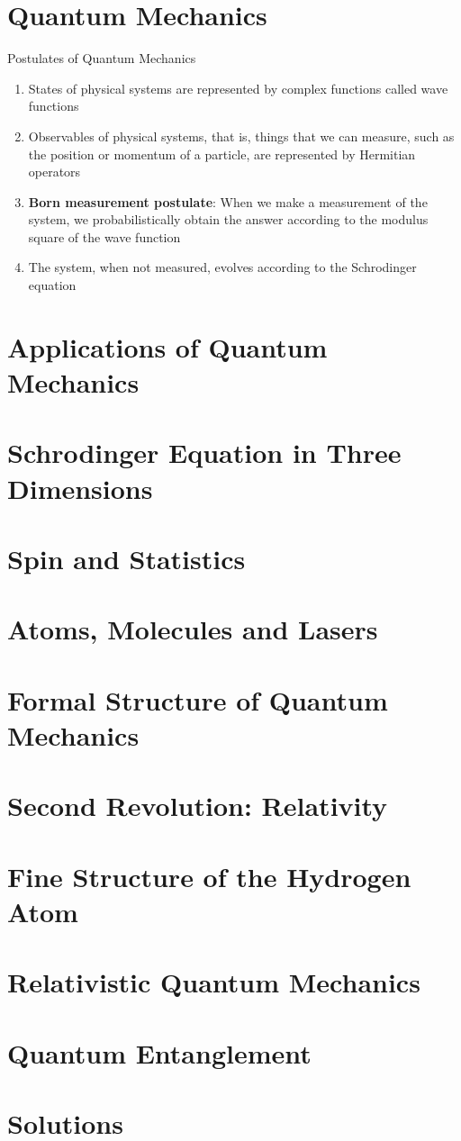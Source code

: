 \documentclass[a4paper]{article}
\begin{document}
\section{Quantum Mechanics}
Postulates of Quantum Mechanics
\begin{enumerate}
    \item States of physical systems are represented by complex functions called wave functions
    \item Observables of physical systems, that is, things that we can measure, such as the position or momentum of a particle, are represented by Hermitian operators
    \item \textbf{Born measurement postulate}: When we make a measurement of the system, we probabilistically obtain the answer according to the modulus square of the wave function
    \item The system, when not measured, evolves according to the Schrodinger equation
\end{enumerate}
\section{Applications of Quantum Mechanics}
\section{Schrodinger Equation in Three Dimensions}
\section{Spin and Statistics}
\section{Atoms, Molecules and Lasers}
\section{Formal Structure of Quantum Mechanics}
\section{Second Revolution: Relativity}
\section{Fine Structure of the Hydrogen Atom}
\section{Relativistic Quantum Mechanics}
\section{Quantum Entanglement}
\section{Solutions}
\end{document}
